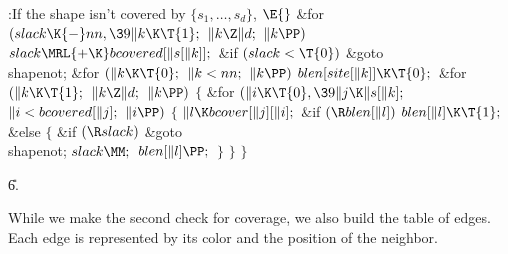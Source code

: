 \B{}:If the shape isn't covered by $\{s_1,\ldots,s_d%
\}$, \X${}\E{}$\6
\&{for} ${}(\\{slack}\K{-}\\{nn},\39\|k\K\T{1};{}$ ${}\|k\Z\|d;{}$ ${}\|k%
\PP){}$\1\5
${}\\{slack}\MRL{+{\K}}\\{bcovered}[\|s[\|k]];{}$\2\6
\&{if} ${}(\\{slack}<\T{0}){}$\1\5
\&{goto} \\{shapenot};\2\6
\&{for} ${}(\|k\K\T{0};{}$ ${}\|k<\\{nn};{}$ ${}\|k\PP){}$\1\5
${}\\{blen}[\\{site}[\|k]]\K\T{0};{}$\2\6
\&{for} ${}(\|k\K\T{1};{}$ ${}\|k\Z\|d;{}$ ${}\|k\PP){}$\5
${}\{{}$\1\6
\&{for} ${}(\|i\K\T{0},\39\|j\K\|s[\|k];{}$ ${}\|i<\\{bcovered}[\|j];{}$ ${}\|i%
\PP){}$\5
${}\{{}$\1\6
${}\|l\K\\{bcover}[\|j][\|i];{}$\6
\&{if} ${}(\R\\{blen}[\|l]){}$\1\5
${}\\{blen}[\|l]\K\T{1};{}$\2\6
\&{else}\5
${}\{{}$\1\6
\&{if} ${}(\R\\{slack}){}$\1\5
\&{goto} \\{shapenot};\2\6
${}\\{slack}\MM;{}$\6
${}\\{blen}[\|l]\PP;{}$\6
\4${}\}{}$\2\6
\4${}\}{}$\2\6
\4${}\}{}$\2\par
\U6.\fi

While we make the second check for coverage, we also
build the table of edges.
Each edge is represented by its color and the position of the neighbor.

